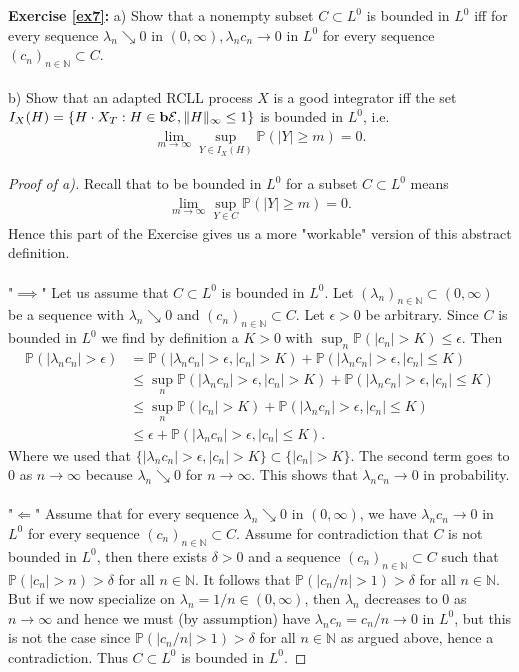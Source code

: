 \documentclass[12pt,a4paper, twoside]{article}
\theoremstyle{definition}
\newcommand{\PP}{\mathbb{P}} %
\newcommand{\simple}{\textbf{\text{b}}\mathcal{E}}
\begin{document}
\newpage
\noindent \textbf{Exercise \ref{ex7}:} a) Show that a nonempty subset $C \subset L^0$ is bounded in $L^0$ iff for every sequence $\lambda_n \searrow 0 $ in $(0, \infty), \lambda_n c_n \to 0$ in $L^0$ for every sequence $(c_n)_{n \in \mathbb{N}} \subset C$. \\\\ b) Show that an adapted RCLL process $X$ is a good integrator iff the set $I_X(H)= \{ H \cdot X_T : H \in \simple, \| H \|_\infty \leq 1\}$ is bounded in $L^0$, i.e.
\begin{align*}
\lim_{m \to \infty} \sup_{Y \in I_X(H)} \PP(|Y| \geq m) =0.
\end{align*}
\begin{proof}[Proof of a)]
Recall that to be bounded in $L^0$ for a subset $C \subset L^0$ means
\begin{align*}
\lim_{m \to \infty} \sup_{Y \in C} \PP(|Y| \geq m)=0.
\end{align*}
Hence this part of the Exercise gives us a more "workable" version of this abstract definition. \\
\\
"$\implies$" Let us assume that $C \subset L^0$ is bounded in $L^0$. Let $( \lambda_n)_{n \in \mathbb{N}} \subset (0,\infty)$ be a sequence with $\lambda_n \searrow  0$ and $(c_n)_{n \in \mathbb{N}} \subset C$. Let $\epsilon >0$ be arbitrary. Since $C$ is bounded in $L^0$ we find by definition a $K>0$ with $\sup_n \PP(|c_n| > K) \leq \epsilon$. Then 
\begin{align*}
\PP(| \lambda_n c_n| > \epsilon ) & = \PP( | \lambda_n c_n| > \epsilon, |c_n| >K)  + \PP(  | \lambda_n c_n| > \epsilon, |c_n| \leq K) \\
& \leq \sup_n \PP(| \lambda_n c_n| > \epsilon, |c_n| >K)+ \PP( | \lambda_n c_n| > \epsilon, |c_n| \leq K) \\
& \leq \sup_n \PP( |c_n| > K) + \PP( | \lambda_n c_n| > \epsilon, |c_n| \leq K) \\
& \leq \epsilon + \PP( | \lambda_n c_n| > \epsilon, |c_n| \leq K).
\end{align*}
Where we used that $\{ | \lambda_nc_n| > \epsilon, |c_n| >K\} \subset \{ |c_n|>K\}$. The second term goes to $0$ as $n \to \infty$ because $\lambda_n \searrow 0$ for $n \to \infty$. This shows that $\lambda_n c_n \to 0$ in probability. 
\\\\
"$\Longleftarrow$" Assume that for every sequence $\lambda_n \searrow 0$ in $(0, \infty)$, we have $\lambda_n c_n \to 0$ in $L^0$ for every sequence $(c_n)_{n \in \mathbb{N}} \subset C$. Assume for contradiction that $C$ is not bounded in $L^0$, then there exists $\delta>0$ and a sequence $(c_n)_{n \in \mathbb{N}} \subset C$ such that $\PP(|c_n| > n) > \delta$ for all $n \in \mathbb{N}$. It follows that  $\PP( |c_n/n| > 1) > \delta$ for all $n \in \mathbb{N}$. But if we now specialize on $\lambda_n= 1/n \in (0, \infty)$, then $\lambda_n$ decreases to $0$ as $n \to \infty$ and hence we must (by assumption) have $\lambda_nc_n = c_n/n \to 0$ in $L^0$, but this is not the case since $\PP(|c_n/n| > 1) > \delta$ for all $n \in \mathbb{N}$ as argued above, hence a contradiction. Thus $C \subset L^0$ is bounded in $L^0$.
\end{proof}
\end{document}
